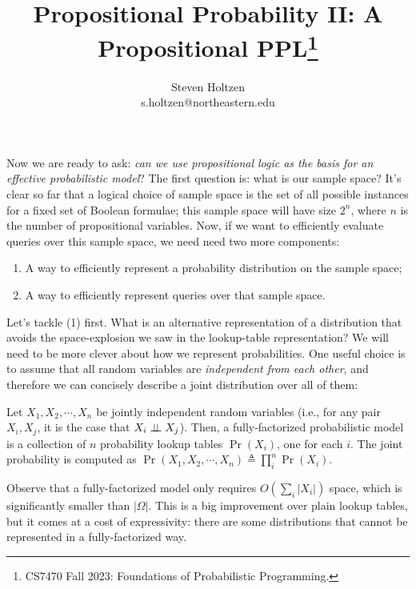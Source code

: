 \documentclass{tufte-handout}
\title{Propositional Probability II: A Propositional PPL\thanks{CS7470 Fall 2023: Foundations of Probabilistic Programming.}}
\author[]{Steven Holtzen\\s.holtzen@northeastern.edu}
\begin{document}
\maketitle%

Now we are ready to ask: \emph{can we use
propositional logic as the basis for an effective probabilistic model}?
The first question is: what is our sample space? It's clear so far that a logical 
choice of sample space is the set of all possible instances for a fixed set 
of Boolean formulae; this sample space will have size $2^n$, where $n$ is the number 
of propositional variables.
Now, if we want to efficiently evaluate queries over this sample space, we need
need two more components:
\begin{enumerate}
    \item A way to efficiently represent a probability distribution on the sample space;
    \item A way to efficiently represent queries over that sample space.
\end{enumerate}


Let's tackle (1) first. What is an alternative representation of a distribution 
that avoids the space-explosion we saw in the lookup-table representation? We 
will need to be more clever about how we represent probabilities. One useful
choice is to assume that all random variables are \emph{independent from each other}, 
and therefore we can concisely describe a joint distribution over all of them:

\begin{definition}
    Let $X_1, X_2, \cdots, X_n$ be jointly independent random variables (i.e.,
    for any pair $X_i, X_j$, it is the case that $X_i \perp \!\!\! \perp X_j$). Then, a
    fully-factorized probabilistic model is a collection of $n$ probability
    lookup tables $\Pr(X_i)$, one for each $i$. The joint probability is computed 
    as $\Pr(X_1, X_2, \cdots, X_n) \triangleq \prod_i^n \Pr(X_i)$.
\end{definition}

Observe that a fully-factorized model only requires $O(\sum_i |X_i|)$ space,
which is significantly smaller than $|\Omega|$. This is a big improvement
over plain lookup tables, but it comes at a cost of expressivity: there are some
distributions that cannot be represented in a fully-factorized way.
\end{document}
